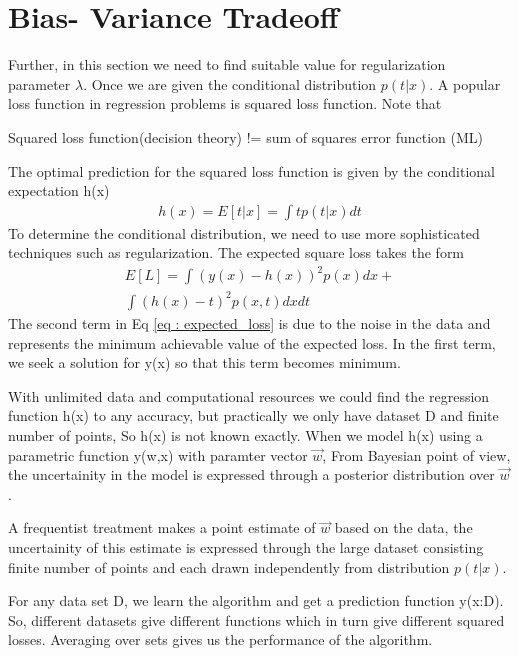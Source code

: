 \documentclass[journal,12pt,twocolumn]{IEEEtran}
\begin{document}
\section{Bias- Variance Tradeoff}
Further, in this section we need to find suitable value for regularization parameter $\lambda$.
Once we are given the conditional distribution $p(t | x)$. A popular loss function in regression problems is squared loss function. Note that 

Squared loss function(decision theory) != sum of squares error function (ML)

The optimal prediction for the squared loss function is given by the conditional expectation h(x)
\begin{align}
    h(x) = E[t | x] = \int t p(t | x)dt
\end{align}
To determine the conditional distribution, we need to use more sophisticated techniques such as regularization. The expected square loss takes the form
\begin{multline}
    E[L] = \int(y(x)-h(x))^2p(x)dx +\\ 
    \int(h(x) - t)^2p(x,t)dx dt \label{eq : expected_loss}
\end{multline}
The second term in Eq \eqref{eq : expected_loss} is due to the noise in the data and represents the minimum achievable value of the expected loss. In the first term, we seek a solution for y(x) so that this term becomes minimum.

With unlimited data and computational resources we could find the regression function h(x) to any accuracy, but practically we only have dataset D and finite number of points, So h(x) is not known exactly.
When we model h(x) using a parametric function y(w,x) with paramter vector $\vec{w}$, From Bayesian point of view, the uncertainity in the model is expressed through a posterior distribution over $\vec{w}$.

A frequentist treatment makes a point estimate of $\vec{w}$ based on the data, the uncertainity of this estimate is expressed through the large dataset consisting finite number of points and each drawn independently from distribution $p(t | x)$.

For any data set D, we learn the algorithm and get a prediction function y(x:D). So, different datasets give different functions which in turn give different squared losses. Averaging over sets gives us the performance of the algorithm.
\end{document}

